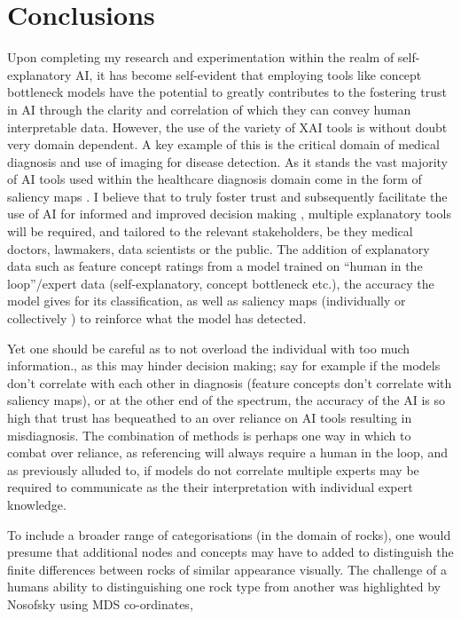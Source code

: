 \chapter{Conclusions}

Upon completing my research and experimentation within the realm of self-explanatory AI, it has become self-evident that employing tools like concept bottleneck models have the potential to greatly contributes to the fostering trust in AI through the clarity and correlation of which they can convey human interpretable data. However, the use of the variety of XAI tools is without doubt very domain dependent. A key example of this is the critical domain of medical diagnosis and use of imaging for disease detection. As it stands the vast majority of AI tools used within the healthcare diagnosis domain come in the form of saliency maps \cite{holzingerXxAIExplainableAI2022a}. I believe that to truly foster trust and subsequently facilitate the use of AI for informed and improved decision making , multiple explanatory tools will be required, and tailored to the relevant stakeholders, be they medical doctors, lawmakers, data scientists or the public. The addition of explanatory data such as feature concept ratings from a model trained on “human in the loop”/expert data (self-explanatory, concept bottleneck etc.), the accuracy the model gives for its classification, as well as saliency maps (individually or collectively ) to reinforce what the model has detected. 

Yet one should be careful as to not overload the individual with too much information., as this may hinder decision making; say for example if the models don’t correlate with each other in diagnosis (feature concepts don’t correlate with saliency maps), or at the other end of the spectrum, the accuracy of the AI is so high that trust has bequeathed to an over reliance on AI tools resulting in misdiagnosis. The combination of methods is perhaps one way in which to combat over reliance, as referencing will always require a human in the loop, and as previously alluded to, if models do not correlate multiple experts may be required to communicate as the their interpretation with individual expert knowledge. 

To include a broader range of categorisations (in the domain of rocks), one would presume that additional nodes and concepts may have to added to distinguish the finite differences between rocks of similar appearance visually. The challenge of a humans ability to distinguishing one rock type from another was highlighted by Nosofsky \cite{nosofskyLearningNaturalScienceCategories2017} using MDS co-ordinates, 

